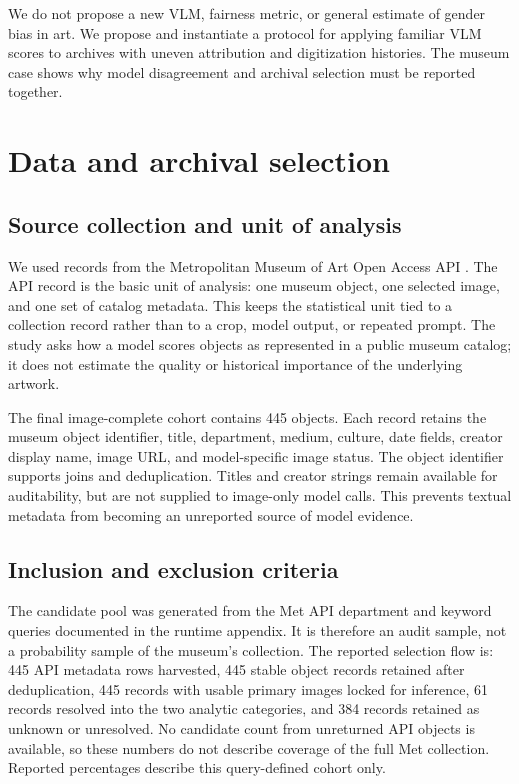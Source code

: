 \documentclass[pdflatex,sn-basic,Numbered]{sn-jnl}
\begin{document}
We do not propose a new VLM, fairness metric, or general estimate of gender bias in art. We propose and instantiate a protocol for applying familiar VLM scores to archives with uneven attribution and digitization histories. The museum case shows why model disagreement and archival selection must be reported together.

\section{Data and archival selection}
\label{sec:data}

\subsection{Source collection and unit of analysis}

We used records from the Metropolitan Museum of Art Open Access API \cite{met_api_2023}. The API record is the basic unit of analysis: one museum object, one selected image, and one set of catalog metadata. This keeps the statistical unit tied to a collection record rather than to a crop, model output, or repeated prompt. The study asks how a model scores objects as represented in a public museum catalog; it does not estimate the quality or historical importance of the underlying artwork.

The final image-complete cohort contains 445 objects. Each record retains the museum object identifier, title, department, medium, culture, date fields, creator display name, image URL, and model-specific image status. The object identifier supports joins and deduplication. Titles and creator strings remain available for auditability, but are not supplied to image-only model calls. This prevents textual metadata from becoming an unreported source of model evidence.

\subsection{Inclusion and exclusion criteria}
The candidate pool was generated from the Met API department and keyword queries documented in the runtime appendix. It is therefore an audit sample, not a probability sample of the museum's collection. The reported selection flow is: 445 API metadata rows harvested, 445 stable object records retained after deduplication, 445 records with usable primary images locked for inference, 61 records resolved into the two analytic categories, and 384 records retained as unknown or unresolved. No candidate count from unreturned API objects is available, so these numbers do not describe coverage of the full Met collection. Reported percentages describe this query-defined cohort only.
\end{document}

